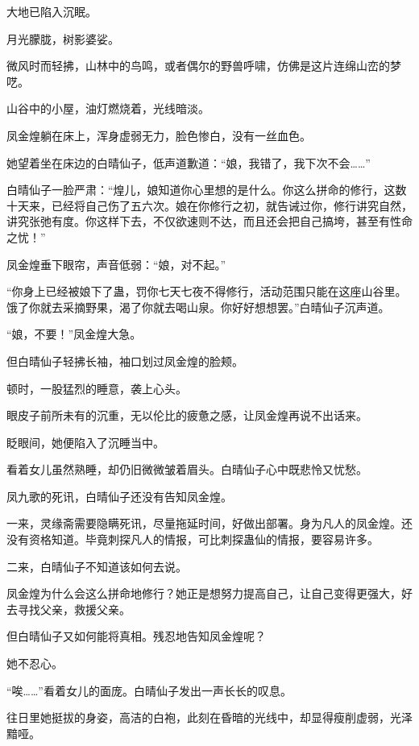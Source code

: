 
\begin{this_body}

大地已陷入沉眠。

月光朦胧，树影婆娑。

微风时而轻拂，山林中的鸟鸣，或者偶尔的野兽呼啸，仿佛是这片连绵山峦的梦呓。

山谷中的小屋，油灯燃烧着，光线暗淡。

凤金煌躺在床上，浑身虚弱无力，脸色惨白，没有一丝血色。

她望着坐在床边的白晴仙子，低声道歉道：“娘，我错了，我下次不会……”

白晴仙子一脸严肃：“煌儿，娘知道你心里想的是什么。你这么拼命的修行，这数十天来，已经将自己伤了五六次。娘在你修行之初，就告诫过你，修行讲究自然，讲究张弛有度。你这样下去，不仅欲速则不达，而且还会把自己搞垮，甚至有性命之忧！”

凤金煌垂下眼帘，声音低弱：“娘，对不起。”

“你身上已经被娘下了蛊，罚你七天七夜不得修行，活动范围只能在这座山谷里。饿了你就去采摘野果，渴了你就去喝山泉。你好好想想罢。”白晴仙子沉声道。

“娘，不要！”凤金煌大急。

但白晴仙子轻拂长袖，袖口划过凤金煌的脸颊。

顿时，一股猛烈的睡意，袭上心头。

眼皮子前所未有的沉重，无以伦比的疲惫之感，让凤金煌再说不出话来。

眨眼间，她便陷入了沉睡当中。

看着女儿虽然熟睡，却仍旧微微皱着眉头。白晴仙子心中既悲怜又忧愁。

凤九歌的死讯，白晴仙子还没有告知凤金煌。

一来，灵缘斋需要隐瞒死讯，尽量拖延时间，好做出部署。身为凡人的凤金煌。还没有资格知道。毕竟刺探凡人的情报，可比刺探蛊仙的情报，要容易许多。

二来，白晴仙子不知道该如何去说。

凤金煌为什么会这么拼命地修行？她正是想努力提高自己，让自己变得更强大，好去寻找父亲，救援父亲。

但白晴仙子又如何能将真相。残忍地告知凤金煌呢？

她不忍心。

“唉……”看着女儿的面庞。白晴仙子发出一声长长的叹息。

往日里她挺拔的身姿，高洁的白袍，此刻在昏暗的光线中，却显得瘦削虚弱，光泽黯哑。


\end{this_body}
